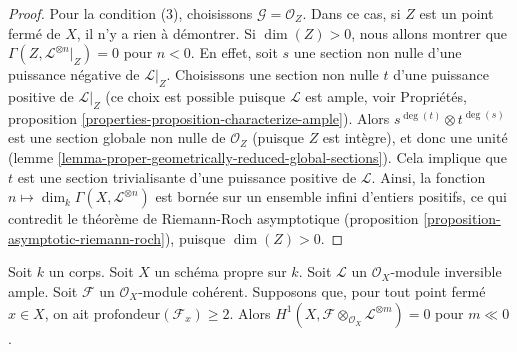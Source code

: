 \begin{proof}
\medskip\noindent
Pour la condition (3), choisissons $\mathcal{G} = \mathcal{O}_Z$.
Dans ce cas, si $Z$ est un point fermé de $X$, il n'y a
rien à démontrer. Si $\dim(Z) > 0$, nous allons montrer que
$\Gamma(Z, \mathcal{L}^{\otimes n}|_Z) = 0$
pour $n < 0$. En effet, soit $s$ une section non nulle d'une puissance négative
de $\mathcal{L}|_Z$. Choisissons une section non nulle $t$ d'une puissance positive
de $\mathcal{L}|_Z$ (ce choix est possible puisque $\mathcal{L}$ est ample, voir
Propriétés, proposition \ref{properties-proposition-characterize-ample}).
Alors $s^{\deg(t)} \otimes t^{\deg(s)}$
est une section globale non nulle de $\mathcal{O}_Z$
(puisque $Z$ est intègre), et donc
une unité (lemme \ref{lemma-proper-geometrically-reduced-global-sections}).
Cela implique que $t$ est une section trivialisante
d'une puissance positive de $\mathcal{L}$.
Ainsi, la fonction $n \mapsto \dim_k \Gamma(X, \mathcal{L}^{\otimes n})$
est bornée sur un ensemble infini d'entiers positifs, ce qui contredit
le théorème de Riemann-Roch asymptotique
(proposition \ref{proposition-asymptotic-riemann-roch}),
puisque $\dim(Z) > 0$.
\end{proof}

\begin{lemma}
\label{lemma-vanishin-h1-negative}
Soit $k$ un corps. Soit $X$ un schéma propre sur $k$. Soit $\mathcal{L}$
un $\mathcal{O}_X$-module inversible ample. Soit $\mathcal{F}$ un
$\mathcal{O}_X$-module cohérent. Supposons que,
pour tout point fermé $x \in X$, on ait $\text{profondeur}(\mathcal{F}_x) \geq 2$.
Alors
$H^1(X, \mathcal{F} \otimes_{\mathcal{O}_X} \mathcal{L}^{\otimes m}) = 0$
pour $m \ll 0$.
\end{lemma}

